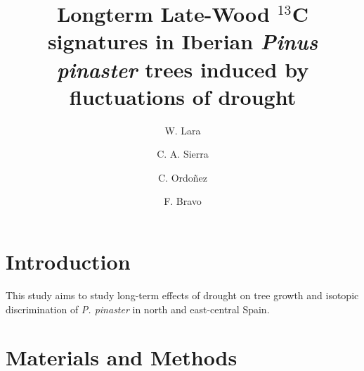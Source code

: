 \documentclass[review,authoryear]{elsarticle}
\begin{document}
\begin{frontmatter}
  \title{\textbf{Longterm Late-Wood $^{13}$C signatures in Iberian
      \textit{Pinus pinaster} trees induced by fluctuations of drought}}

\author[aut1,aut2]{W. Lara}
\author[aut1]{C. A.  Sierra }
\author[aut1]{C. Ordo{\~n}ez}
\author[aut1]{F. Bravo}


\address[aut1]{Sustainable Forest Management Research
  Institute,UVA-INIA, Avenida Madrid, s/n, 34071, Palencia, Spain}

\address[focal]{Department of Biogeochemical Processes, Max Planck
  Institute for Biogeochemistry, Hans-Kn\"oll-Stra\ss e 10, 07745,
  Jena, Germany}

\address[aut2]{Research Center on Ecosystems and Global Change,
  Carbono \& Bosques $($C\&B$)$, Calle 51A, N$^o$ 72-23, Int: 601,
  050034, Medell{\'i}n, Colombia}

\begin{abstract}
\end{abstract}
\begin{keyword}
\end{keyword}
\end{frontmatter}

\linenumbers
\section{Introduction}\label{sec:intro}

This study aims to study long-term effects of drought on tree growth
and isotopic discrimination of \textit{P. pinaster} in north and
east-central Spain.



\section{Materials and Methods}
\end{document}
